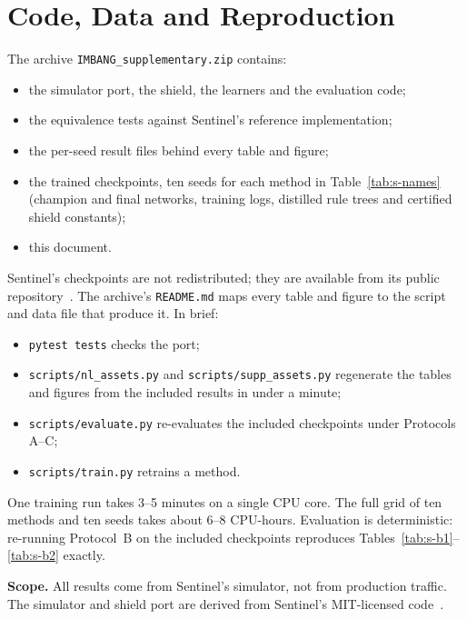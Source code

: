 \documentclass[10pt,journal,onecolumn]{IEEEtran}
\begin{document}
\section{Code, Data and Reproduction}
\label{sec:s-repro}
The archive \texttt{IMBANG\_supplementary.zip} contains:
\begin{itemize}
\item the simulator port, the shield, the learners and the evaluation code;
\item the equivalence tests against Sentinel's reference implementation;
\item the per-seed result files behind every table and figure;
\item the trained checkpoints, ten seeds for each method in Table~\ref{tab:s-names} (champion and final networks, training logs, distilled rule trees and certified shield constants);
\item this document.
\end{itemize}
Sentinel's checkpoints are not redistributed; they are available from its public repository~\cite{sentinelcode}. The archive's \texttt{README.md} maps every table and figure to the script and data file that produce it. In brief:
\begin{itemize}
\item \texttt{pytest tests} checks the port;
\item \texttt{scripts/nl\_assets.py} and \texttt{scripts/supp\_assets.py} regenerate the tables and figures from the included results in under a minute;
\item \texttt{scripts/evaluate.py} re-evaluates the included checkpoints under Protocols A--C;
\item \texttt{scripts/train.py} retrains a method.
\end{itemize}
One training run takes 3--5 minutes on a single CPU core. The full grid of ten methods and ten seeds takes about 6--8 CPU-hours. Evaluation is deterministic: re-running Protocol~B on the included checkpoints reproduces Tables~\ref{tab:s-b1}--\ref{tab:s-b2} exactly.

\textbf{Scope.} All results come from Sentinel's simulator, not from production traffic. The simulator and shield port are derived from Sentinel's MIT-licensed code~\cite{sentinelcode}.



\end{document}
